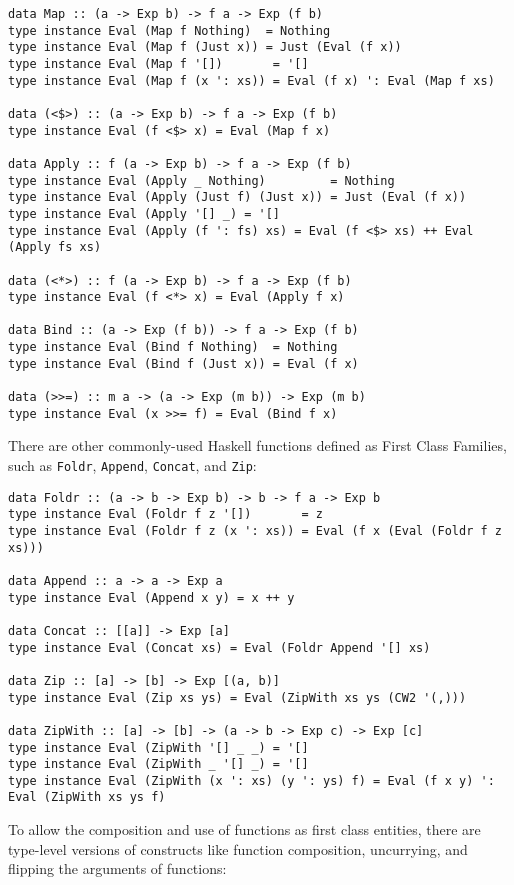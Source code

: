 \documentclass[12pt, a4paper, bibliography=totocnumbered]{scrreprt}
\newcommand{\inline}[1]{\lstinline[basicstyle=\ttfamily\footnotesize]{#1}}
\begin{document}
\begin{lstlisting}
data Map :: (a -> Exp b) -> f a -> Exp (f b)
type instance Eval (Map f Nothing)  = Nothing
type instance Eval (Map f (Just x)) = Just (Eval (f x))
type instance Eval (Map f '[])       = '[]
type instance Eval (Map f (x ': xs)) = Eval (f x) ': Eval (Map f xs)

data (<$>) :: (a -> Exp b) -> f a -> Exp (f b)
type instance Eval (f <$> x) = Eval (Map f x)

data Apply :: f (a -> Exp b) -> f a -> Exp (f b)
type instance Eval (Apply _ Nothing)         = Nothing
type instance Eval (Apply (Just f) (Just x)) = Just (Eval (f x))
type instance Eval (Apply '[] _) = '[]
type instance Eval (Apply (f ': fs) xs) = Eval (f <$> xs) ++ Eval (Apply fs xs)

data (<*>) :: f (a -> Exp b) -> f a -> Exp (f b)
type instance Eval (f <*> x) = Eval (Apply f x)

data Bind :: (a -> Exp (f b)) -> f a -> Exp (f b)
type instance Eval (Bind f Nothing)  = Nothing
type instance Eval (Bind f (Just x)) = Eval (f x)

data (>>=) :: m a -> (a -> Exp (m b)) -> Exp (m b)
type instance Eval (x >>= f) = Eval (Bind f x)
\end{lstlisting}

There are other commonly-used Haskell functions defined as First Class Families, such as \inline{Foldr}, \inline{Append}, \inline{Concat}, and \inline{Zip}:

\begin{lstlisting}
data Foldr :: (a -> b -> Exp b) -> b -> f a -> Exp b
type instance Eval (Foldr f z '[])       = z
type instance Eval (Foldr f z (x ': xs)) = Eval (f x (Eval (Foldr f z xs)))

data Append :: a -> a -> Exp a
type instance Eval (Append x y) = x ++ y

data Concat :: [[a]] -> Exp [a]
type instance Eval (Concat xs) = Eval (Foldr Append '[] xs)

data Zip :: [a] -> [b] -> Exp [(a, b)]
type instance Eval (Zip xs ys) = Eval (ZipWith xs ys (CW2 '(,)))

data ZipWith :: [a] -> [b] -> (a -> b -> Exp c) -> Exp [c]
type instance Eval (ZipWith '[] _ _) = '[]
type instance Eval (ZipWith _ '[] _) = '[]
type instance Eval (ZipWith (x ': xs) (y ': ys) f) = Eval (f x y) ': Eval (ZipWith xs ys f)
\end{lstlisting}

To allow the composition and use of functions as first class entities, there are type-level versions of constructs like function composition, uncurrying, and flipping the arguments of functions:
\end{document}
